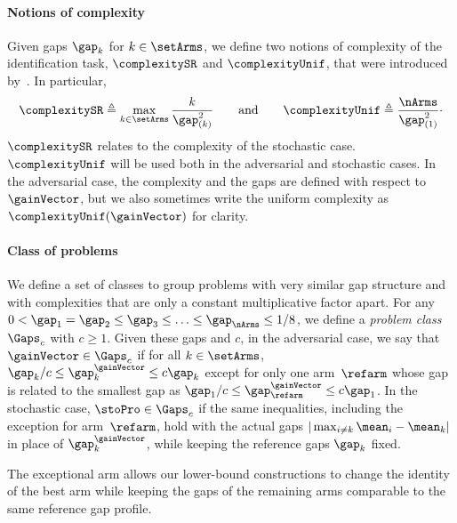 \paragraph{Notions of complexity} Given 
gaps $\gap_{k}$ for $k\in\setArms$, we define two notions of 
complexity of the identification task, 
$\complexitySR$ and $\complexityUnif$, that were introduced by~\cite{Audibert10BA}. 
In particular,
 \[
 \complexitySR
 \triangleq
 \max_{k\in\setArms}\frac{k}{\gap^2_{(k)}}
 \qquad\text{and}\qquad
 \complexityUnif 
\triangleq
 \frac{\nArms}{\gap_{(1)}^2}\cdot
 \]
   $\complexitySR$ relates to the complexity of the stochastic 
   case. $\complexityUnif$ will be used both in the 
   adversarial and stochastic cases. 
In the adversarial case, the complexity and the gaps 
are defined with respect to $\gainVector$, 
but we also sometimes  write the uniform complexity as  $ \complexityUnif (\gainVector)$ for clarity.


\paragraph{Class of problems}  We define a set of classes to group problems with
very similar gap structure and with complexities that are only a 
constant multiplicative factor apart.
For any $0<\gap_1=\gap_2\leq\gap_3\leq \ldots\leq 
\gap_\nArms\leq 1/8$, we define a \textit{problem class} 
$\Gaps_{c}$ with
$c\geq 1$. 
Given these gaps and $c$, in the adversarial case, we say that 
$\gainVector\in\Gaps_{c}$  if  for all $k\in\setArms$, $\gap_k/c
 \leq\gap^{\gainVector}_k\leq c\gap_k$ except for only one 
 arm~$\refarm$  whose gap is related to the smallest gap as $\gap_{1}/c\leq\gap^{\gainVector}_{\refarm}\leq c\gap_{1}$.
In the stochastic case, $\stoPro\in\Gaps_{c}$ if the same inequalities,
including the exception for arm~$\refarm$, hold with the actual gaps
$|\max_{i \neq k} \mean_i-\mean_k|$ in place of $\gap^{\gainVector}_k$,
while keeping the reference gaps $\gap_k$ fixed.

The exceptional arm allows our lower-bound
constructions to change the identity of the
best arm while keeping the gaps of the
remaining arms comparable to the same
reference gap profile.


